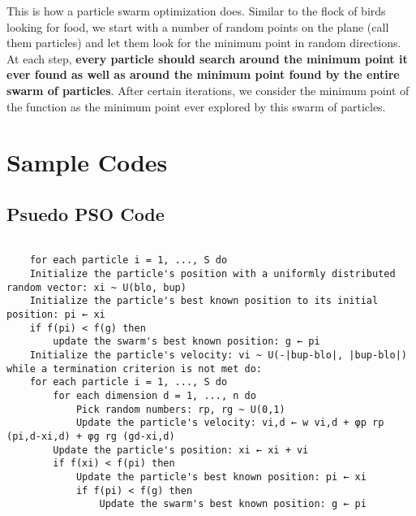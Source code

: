 \documentclass[12pt]{report}
\begin{document}
This is how a particle swarm optimization does. Similar to the flock of birds looking for food, we start with a number of random points on the plane (call them particles) and let them look for the minimum point in random directions. At each step, \textbf{every particle should search around the minimum point it ever found as well as around the minimum point found by the entire swarm of particles}. After certain iterations, we consider the minimum point of the function as the minimum point ever explored by this swarm of particles.

\section{Sample Codes}

\subsection{Psuedo PSO Code}

%

\begin{verbatim}

    for each particle i = 1, ..., S do
    Initialize the particle's position with a uniformly distributed random vector: xi ~ U(blo, bup)
    Initialize the particle's best known position to its initial position: pi ← xi
    if f(pi) < f(g) then
        update the swarm's best known position: g ← pi
    Initialize the particle's velocity: vi ~ U(-|bup-blo|, |bup-blo|)
while a termination criterion is not met do:
    for each particle i = 1, ..., S do
        for each dimension d = 1, ..., n do
            Pick random numbers: rp, rg ~ U(0,1)
            Update the particle's velocity: vi,d ← w vi,d + φp rp (pi,d-xi,d) + φg rg (gd-xi,d)
        Update the particle's position: xi ← xi + vi
        if f(xi) < f(pi) then
            Update the particle's best known position: pi ← xi
            if f(pi) < f(g) then
                Update the swarm's best known position: g ← pi
                
\end{verbatim}
\end{document}
